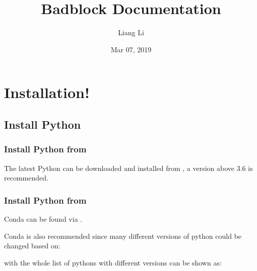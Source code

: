 \documentclass[letterpaper,10pt,english]{sphinxmanual}
\title{Badblock Documentation}
\date{Mar 07, 2019}
\author{Liang Li}
\begin{document}
\pagestyle{empty}
\maketitle
\pagestyle{plain}
\sphinxtableofcontents
\pagestyle{normal}
\label{\detokenize{index::doc}}



\chapter{Installation!}
\label{\detokenize{usage/installation:installation}}\label{\detokenize{usage/installation::doc}}

\section{Install Python}
\label{\detokenize{usage/installation:install-python}}

\subsection{Install Python from }
\label{\detokenize{usage/installation:install-python-from-python}}
The latest Python can be downloaded and installed from  , a version above 3.6 is recommended.


\subsection{Install Python from }
\label{\detokenize{usage/installation:install-python-from-conda}}
Conda can be found via .

Conda is also recommended since many different versions of python could be changed based on:

%
\begin{sphinxVerbatim}[commandchars=\\\{\}]
\end{sphinxVerbatim}

with the whole list of pythons with different versions can be shown as:

%
\begin{sphinxVerbatim}[commandchars=\\\{\}]
\end{sphinxVerbatim}
\end{document}
